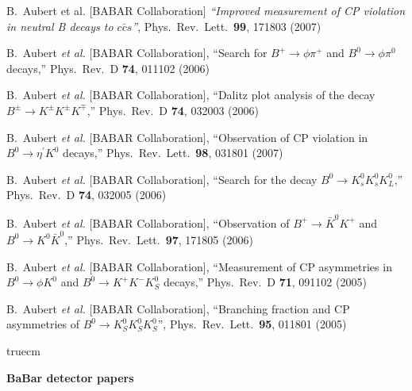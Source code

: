   B.~Aubert et al. [BABAR Collaboration] 
  {\it ``Improved measurement of CP violation in neutral B decays to $c \bar{c} s$''},
  Phys.\ Rev.\ Lett.\  {\bf 99}, 171803 (2007)

  B.~Aubert {\it et al.}  [BABAR Collaboration],
  ``Search for $B^+ \to \phi \pi^+$ and $B^0 \to \phi \pi^0$ decays,''
  Phys.\ Rev.\ D {\bf 74}, 011102 (2006)

  B.~Aubert {\it et al.}  [BABAR Collaboration],
  ``Dalitz plot analysis of the decay $B^{\pm} \to K^{\pm} K^{\pm} K^{\mp}$,''
  Phys.\ Rev.\  D {\bf 74}, 032003 (2006)


  B.~Aubert {\it et al.}  [BABAR Collaboration],
  ``Observation of CP violation in $B^0 \to \eta^\prime K^0$ decays,''
  Phys.\ Rev.\ Lett.\  {\bf 98}, 031801 (2007)

  B.~Aubert {\it et al.}  [BABAR Collaboration],
  ``Search for the decay $B^0 \to K^0_{s} K^0_{s} K^0_{L}$,''
  Phys.\ Rev.\  D {\bf 74}, 032005 (2006)

  B.~Aubert {\it et al.}  [BABAR Collaboration],
  ``Observation of $B^{+} \to \bar{K}^0 K^{+}$ and $B^0 \to K^0 \bar{K}^0$,''
  Phys.\ Rev.\ Lett.\  {\bf 97}, 171805 (2006)

  B.~Aubert {\it et al.}  [BABAR Collaboration],
   ``Measurement of CP asymmetries in $B^0 \to \phi K^0$ and $B^0 \to K^+ K^-K^0_S$  decays,''
  Phys.\ Rev.\ D {\bf 71}, 091102 (2005)

  B.~Aubert {\it et al.}  [BABAR Collaboration],
  ``Branching fraction and CP asymmetries of $B^0 \to K^0_S K^0_S K^0_S$'', 
  Phys.\ Rev.\ Lett.\  {\bf 95}, 011801 (2005)


 truecm

{\bf BaBar detector papers}

